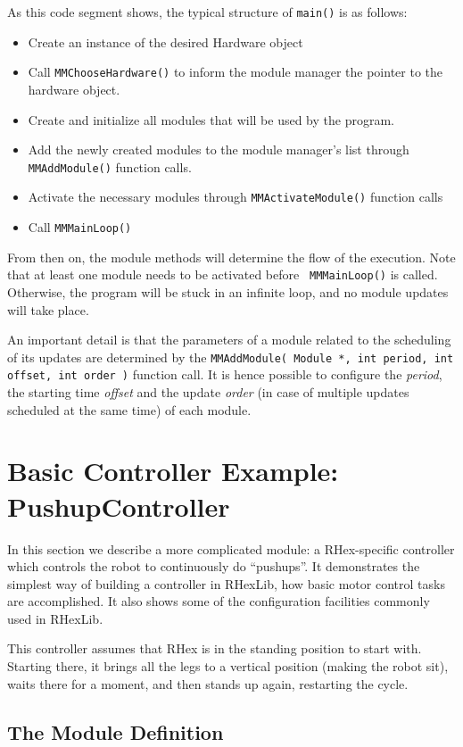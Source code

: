 As this code segment shows, the typical structure of {\tt main()} is as
follows:
\begin{itemize}
\item{Create an instance of the desired Hardware object}
\item{Call {\tt MMChooseHardware()} to inform the module manager the pointer
    to the hardware object.}
\item{Create and initialize all modules that will be used by the program.}
\item{Add the newly created modules to the module manager's list through
    {\tt MMAddModule()} function calls.}
\item{Activate the necessary modules through {\tt MMActivateModule()}
    function calls}
\item{Call {\tt MMMainLoop()}}
\end{itemize}

From then on, the module methods will determine the flow of the
execution. Note that at least one module needs to be activated before {\tt
MMMainLoop()} is called. Otherwise, the program will be stuck in an infinite
loop, and no module updates will take place.

An important detail is that the parameters of a module related to the
scheduling of its updates are determined by the {\tt MMAddModule( Module *,
  int period, int offset, int order )} function
call. It is hence possible to configure the {\em period}, the starting time
{\em offset} and the update {\em order} (in case of multiple updates
scheduled at the same time) of each module.

\section{Basic Controller Example: PushupController} \label{sec-pushup}

In this section we describe a more complicated module: a RHex-specific
controller which controls the robot to continuously do ``pushups''. It
demonstrates the simplest way of building a controller in RHexLib, how basic
motor control tasks are accomplished. It also shows some of the
configuration facilities commonly used in RHexLib.

This controller assumes that RHex is in the standing position to start
with. Starting there, it brings all the legs to a vertical position (making
the robot sit), waits there for a moment, and then stands up again,
restarting the cycle.

\subsection{The Module Definition}

